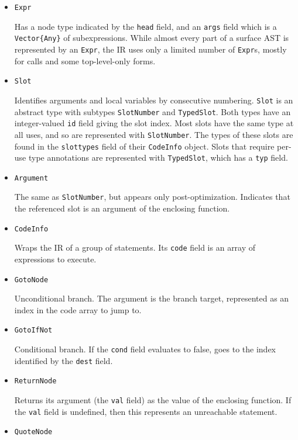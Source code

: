 \begin{itemize}
\item \texttt{Expr}

Has a node type indicated by the \texttt{head} field, and an \texttt{args} field which is a \texttt{Vector\{Any\}} of subexpressions. While almost every part of a surface AST is represented by an \texttt{Expr}, the IR uses only a limited number of \texttt{Expr}s, mostly for calls and some top-level-only forms.


\item \texttt{Slot}

Identifies arguments and local variables by consecutive numbering. \texttt{Slot} is an abstract type with subtypes \texttt{SlotNumber} and \texttt{TypedSlot}. Both types have an integer-valued \texttt{id} field giving the slot index. Most slots have the same type at all uses, and so are represented with \texttt{SlotNumber}. The types of these slots are found in the \texttt{slottypes} field of their \texttt{CodeInfo} object. Slots that require per-use type annotations are represented with \texttt{TypedSlot}, which has a \texttt{typ} field.


\item \texttt{Argument}

The same as \texttt{SlotNumber}, but appears only post-optimization. Indicates that the referenced slot is an argument of the enclosing function.


\item \texttt{CodeInfo}

Wraps the IR of a group of statements. Its \texttt{code} field is an array of expressions to execute.


\item \texttt{GotoNode}

Unconditional branch. The argument is the branch target, represented as an index in the code array to jump to.


\item \texttt{GotoIfNot}

Conditional branch. If the \texttt{cond} field evaluates to false, goes to the index identified by the \texttt{dest} field.


\item \texttt{ReturnNode}

Returns its argument (the \texttt{val} field) as the value of the enclosing function. If the \texttt{val} field is undefined, then this represents an unreachable statement.


\item \texttt{QuoteNode}


\end{itemize}
